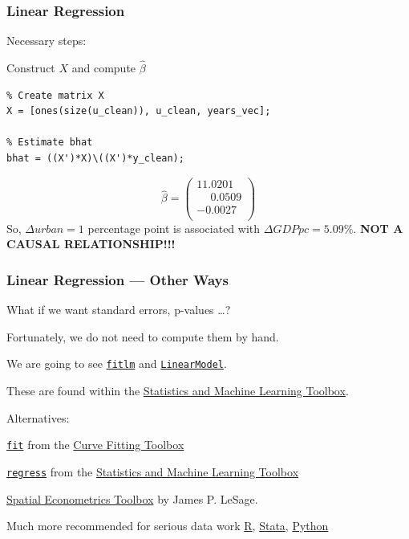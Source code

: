 \documentclass[11pt,xcolor={svgnames},aspectratio=169,usepdftitle=false]{beamer}
\let\toneitemize\itemize
\let\ttwoitemize\enditemize
\renewenvironment{itemize}{\toneitemize\addtolength{\itemsep}{0.7\baselineskip}}{\ttwoitemize}
\let\toneenumer\enumerate
\let\ttwoenumer\endenumerate
\renewenvironment{enumerate}{\toneenumer\addtolength{\itemsep}{0.7\baselineskip}}{\ttwoenumer}
\begin{document}
\begin{frame}[fragile]
  \frametitle{Linear Regression}
Necessary steps:
\begin{enumerate}
  \setcounter{enumi}{2}
  \item Construct $X$ and compute $\hat{\beta}$
\end{enumerate}
\begin{lstlisting}
% Create matrix X
X = [ones(size(u_clean)), u_clean, years_vec];

% Estimate bhat
bhat = ((X')*X)\((X')*y_clean);
\end{lstlisting}
\[
\hat{\beta} = \begin{pmatrix}
11.0201 \\
\phantom{-}0.0509  \\
-0.0027 \\
\end{pmatrix}
\]
So, $\Delta urban = 1$ percentage point is associated with $\Delta GDPpc =  5.09\%$. \alert{\textbf{NOT A CAUSAL RELATIONSHIP!!!}}
\end{frame}

\begin{frame}[fragile]
  \frametitle{Linear Regression --- Other Ways}
\begin{itemize}
  \item What if we want standard errors, p-values \ldots ?
  \item Fortunately, we do not need to compute them by hand.
  \item We are going to see \href{https://www.mathworks.com/help/stats/fitlm.html?s_tid=doc_ta}{\texttt{fitlm}} and \href{https://www.mathworks.com/help/stats/linearmodel.html}{\texttt{LinearModel}}.
  \item These are found within the \href{https://www.mathworks.com/help/stats/index.html?s_tid=CRUX_lftnav}{Statistics and Machine Learning Toolbox}.
  \item Alternatives:
  \begin{itemize}
    \item \href{https://www.mathworks.com/help/curvefit/fit.html?s_tid=doc_ta}{\texttt{fit}} from the \href{https://www.mathworks.com/help/curvefit/index.html?s_tid=CRUX_lftnav}{Curve Fitting Toolbox}
    \item \href{https://www.mathworks.com/help/stats/regress.html}{\texttt{regress}} from the \href{https://www.mathworks.com/help/stats/index.html?s_tid=CRUX_lftnav}{Statistics and Machine Learning Toolbox}
    \item \href{https://www.spatial-econometrics.com/}{Spatial Econometrics Toolbox} by James P. LeSage.
    \item Much more recommended for serious data work \href{https://www.r-project.org/}{R}, \href{https://www.stata.com/}{Stata}, \href{https://www.python.org/}{Python}
  \end{itemize}
\end{itemize}
\end{frame}
\end{document}
